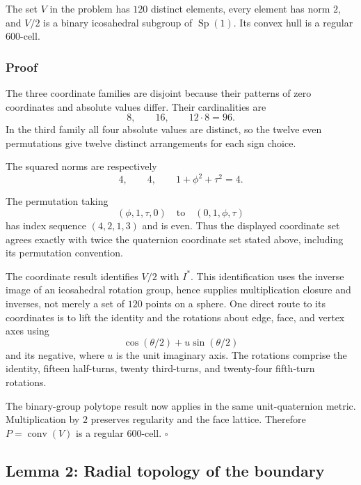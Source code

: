 \documentclass[
  10pt,
  a4paper,
]{article}
\begin{document}
The set \(V\) in the problem has \(120\) distinct elements, every
element has norm \(2\), and \(V/2\) is a binary icosahedral subgroup of
\(\operatorname{Sp}(1)\). Its convex hull is a regular 600-cell.

\subsubsection{Proof}\label{proof}

The three coordinate families are disjoint because their patterns of
zero coordinates and absolute values differ. Their cardinalities are
\begin{equation}
8,\qquad 16,\qquad 12\cdot8=96.
\end{equation} In the third family all four absolute values are
distinct, so the twelve even permutations give twelve distinct
arrangements for each sign choice.

The squared norms are respectively \begin{equation}
4,\qquad 4,\qquad 1+\phi^2+\tau^2=4.
\end{equation}

The permutation taking \begin{equation}
(\phi,1,\tau,0)\quad\text{to}\quad(0,1,\phi,\tau)
\end{equation} has index sequence \((4,2,1,3)\) and is even. Thus the
displayed coordinate set agrees exactly with twice the quaternion
coordinate set stated above, including its permutation convention.

The coordinate result identifies \(V/2\) with \(I^*\). This
identification uses the inverse image of an icosahedral rotation group,
hence supplies multiplication closure and inverses, not merely a set of
\(120\) points on a sphere. One direct route to its coordinates is to
lift the identity and the rotations about edge, face, and vertex axes
using \begin{equation}
\cos(\theta/2)+u\sin(\theta/2)
\end{equation} and its negative, where \(u\) is the unit imaginary axis.
The rotations comprise the identity, fifteen half-turns, twenty
third-turns, and twenty-four fifth-turn rotations.

The binary-group polytope result now applies in the same unit-quaternion
metric. Multiplication by \(2\) preserves regularity and the face
lattice. Therefore \(P=\operatorname{conv}(V)\) is a regular 600-cell.
\(\square\)

\subsection{Lemma 2: Radial topology of the
boundary}\label{lemma-2-radial-topology-of-the-boundary}
\end{document}
